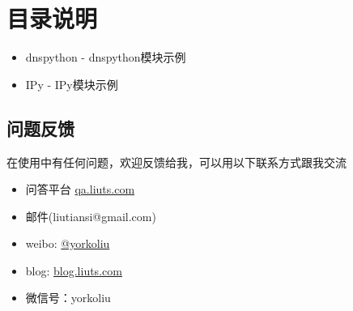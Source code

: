 \documentclass[a4paper,12pt]{ctexbook}
\begin{document}
\chapter{目录说明}
\begin{itemize}
\item dnspython - dnspython模块示例
\item IPy - IPy模块示例
\end{itemize}
\section{问题反馈}
在使用中有任何问题，欢迎反馈给我，可以用以下联系方式跟我交流

\begin{itemize}
\item 问答平台 \href{http://qa.liuts.com}{qa.liuts.com}
\item 邮件(liutiansi@gmail.com)
\item weibo: \href{http://weibo.com/u/1775431677}{@yorkoliu}
\item blog: \href{http://blog.liuts.com}{blog.liuts.com}
\item 微信号：yorkoliu
\end{itemize}
\end{document}
